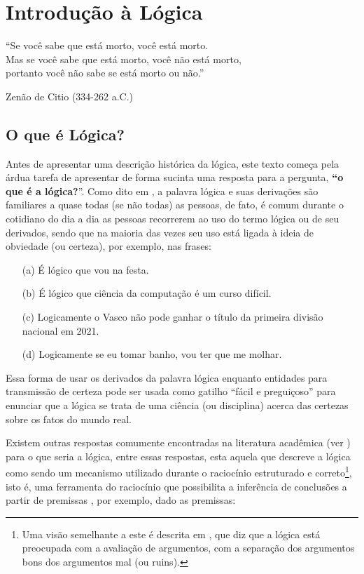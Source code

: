 \chapter{Introdução à Lógica}\label{cap:IntroLogic}

\epigraph{``Se você sabe que está morto, você está morto.\\ Mas se você sabe que está morto, você não está morto,\\ portanto você não sabe se está morto ou não.''}{Zenão de Citio (334-262 a.C.)}

\section{O que é Lógica?}\label{sec:WhatIsLogic}

Antes de apresentar uma descrição histórica da lógica, este texto começa pela árdua tarefa de apresentar de forma sucinta uma resposta para a pergunta, \textbf{``o que é a lógica?}''. Como dito em \cite{benja-Logica, copi1981}, a palavra lógica e suas derivações são familiares a quase todas (se não todas) as pessoas, de fato, é comum durante o cotidiano do dia a dia as pessoas recorrerem ao uso do termo lógica ou de seu derivados, sendo que na maioria das vezes seu uso está ligada à ideia de obviedade (ou certeza), por exemplo, nas frases:

\begin{itemize}
	\item[(a)] É lógico que vou na festa.
	\item[(b)] É lógico que ciência da computação é um curso difícil.
	\item[(c)] Logicamente o Vasco não pode ganhar o título da primeira divisão nacional em 2021.
	\item[(d)] Logicamente se eu tomar banho, vou ter que me molhar.
\end{itemize}

Essa forma de usar os derivados da palavra lógica enquanto entidades para transmissão de certeza pode ser usada como gatilho ``fácil e preguiçoso'' para enunciar que a lógica se trata de uma ciência (ou disciplina) acerca das certezas sobre os fatos do mundo real.

Existem outras respostas comumente encontradas na literatura acadêmica (ver \cite{abe2002-logica, benja-Logica, joaoPavao2014}) para o que seria a lógica, entre essas respostas, esta aquela que descreve a lógica como sendo um mecanismo utilizado durante o raciocínio estruturado e correto\footnote{Uma visão semelhante a este é descrita em \cite{magnus2020}, que diz que a lógica está preocupada com a avaliação de argumentos, com a separação dos argumentos bons dos argumentos mal (ou ruins).}, isto é, uma ferramenta do raciocínio que possibilita a inferência de conclusões a partir de premissas \cite{abe2002-logica, copi1981, hodges1997}, por exemplo, dado as premissas:

